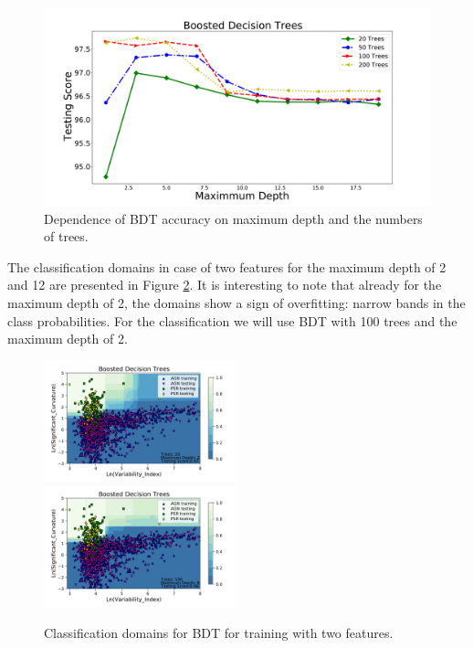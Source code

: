 \begin{figure}[h]
\includegraphics[width=\twopicsp\textwidth]{plots/bdt_train_assocnewfeats.pdf}
\caption{Dependence of BDT accuracy on maximum depth and the numbers of trees.}
\label{fig:BDT_depth}
\end{figure}

The classification domains in case of two features for the maximum depth of 2 and 12 are presented in Figure \ref{fig:BDT_domains}. 
It is interesting to note that already for the maximum depth of 2, the domains show a sign of overfitting: narrow bands in the class probabilities. For the classification we will use BDT with 100 trees and the maximum depth of 2.

\begin{figure}[h]
\includegraphics[width=0.5\textwidth]{plots/classification_domains/bdt_20_2.pdf}
\includegraphics[width=0.5\textwidth]{plots/classification_domains/bdt_100_6.pdf}
\caption{Classification domains for BDT for training with two features.
}
\label{fig:BDT_domains}
\end{figure}


